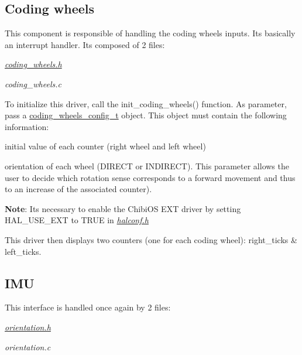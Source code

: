 \subsection*{Coding wheels}

This component is responsible of handling the coding wheels inputs. It\textquotesingle{}s basically an interrupt handler. It\textquotesingle{}s composed of 2 files\+:
\begin{DoxyItemize}
\item {\itshape \hyperlink{coding__wheels_8h_source}{coding\+\_\+wheels.\+h}}
\item {\itshape coding\+\_\+wheels.\+c}
\end{DoxyItemize}

To initialize this driver, call the {\ttfamily init\+\_\+coding\+\_\+wheels()} function. As parameter, pass a {\ttfamily \hyperlink{structcoding__wheels__config__t}{coding\+\_\+wheels\+\_\+config\+\_\+t}} object. This object must contain the following information\+:
\begin{DoxyItemize}
\item initial value of each counter (right wheel and left wheel)
\item orientation of each wheel (D\+I\+R\+E\+CT or I\+N\+D\+I\+R\+E\+CT). This parameter allows the user to decide which rotation sense corresponds to a forward movement and thus to an increase of the associated counter).
\end{DoxyItemize}

{\bfseries Note}\+: It\textquotesingle{}s necessary to enable the Chibi\+OS E\+XT driver by setting {\ttfamily H\+A\+L\+\_\+\+U\+S\+E\+\_\+\+E\+XT} to {\ttfamily T\+R\+UE} in {\itshape \hyperlink{halconf_8h_source}{halconf.\+h}}

This driver then displays two counters (one for each coding wheel)\+: {\ttfamily right\+\_\+ticks} \& {\ttfamily left\+\_\+ticks}.

\subsection*{I\+MU}

This interface is handled once again by 2 files\+:
\begin{DoxyItemize}
\item {\itshape \hyperlink{orientation_8h_source}{orientation.\+h}}
\item {\itshape orientation.\+c}
\end{DoxyItemize}

